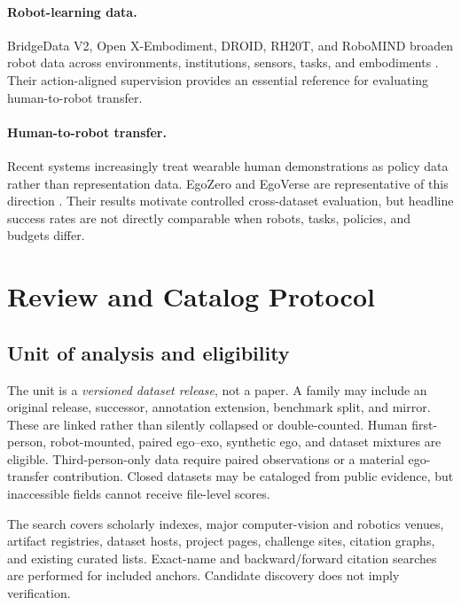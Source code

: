 \documentclass{article}
\begin{document}
\paragraph{Robot-learning data.}
BridgeData V2, Open X-Embodiment, DROID, RH20T, and RoboMIND broaden robot data across environments, institutions, sensors, tasks, and embodiments \citep{walke2023bridge,oxe2024,khazatsky2024droid,fang2024rh20t,wu2025robomind}. Their action-aligned supervision provides an essential reference for evaluating human-to-robot transfer.

\paragraph{Human-to-robot transfer.}
Recent systems increasingly treat wearable human demonstrations as policy data rather than representation data. EgoZero and EgoVerse are representative of this direction \citep{liu2025egozero,punamiya2026egoverse}. Their results motivate controlled cross-dataset evaluation, but headline success rates are not directly comparable when robots, tasks, policies, and budgets differ.

\section{Review and Catalog Protocol}

\subsection{Unit of analysis and eligibility}

The unit is a \emph{versioned dataset release}, not a paper. A family may include an original release, successor, annotation extension, benchmark split, and mirror. These are linked rather than silently collapsed or double-counted. Human first-person, robot-mounted, paired ego--exo, synthetic ego, and dataset mixtures are eligible. Third-person-only data require paired observations or a material ego-transfer contribution. Closed datasets may be cataloged from public evidence, but inaccessible fields cannot receive file-level scores.

The search covers scholarly indexes, major computer-vision and robotics venues, artifact registries, dataset hosts, project pages, challenge sites, citation graphs, and existing curated lists. Exact-name and backward/forward citation searches are performed for included anchors. Candidate discovery does not imply verification.
\end{document}
